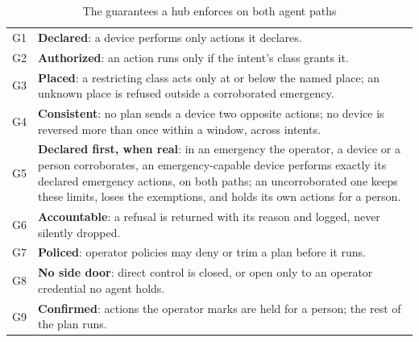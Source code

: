 \documentclass[conference]{IEEEtran}
\begin{document}
\begin{table}[t]
\caption{The guarantees a hub enforces on both agent paths}
\label{tab:guarantees}
\centering
\scriptsize
\setlength{\tabcolsep}{2.5pt}
\renewcommand{\arraystretch}{1.08}
\begin{tabular}{@{}l>{\raggedright\arraybackslash}p{}@{}}
\toprule
G1 & \textbf{Declared}: a device performs only actions it declares. \\
G2 & \textbf{Authorized}: an action runs only if the intent's class grants it. \\
G3 & \textbf{Placed}: a restricting class acts only at or below the named place; an unknown place is refused outside a corroborated emergency. \\
G4 & \textbf{Consistent}: no plan sends a device two opposite actions; no device is reversed more than once within a window, across intents. \\
G5 & \textbf{Declared first, when real}: in an emergency the operator, a device or a person corroborates, an emergency-capable device performs exactly its declared emergency actions, on both paths; an uncorroborated one keeps these limits, loses the exemptions, and holds its own actions for a person. \\
G6 & \textbf{Accountable}: a refusal is returned with its reason and logged, never silently dropped. \\
G7 & \textbf{Policed}: operator policies may deny or trim a plan before it runs. \\
G8 & \textbf{No side door}: direct control is closed, or open only to an operator credential no agent holds. \\
G9 & \textbf{Confirmed}: actions the operator marks are held for a person; the rest of the plan runs. \\
\bottomrule
\end{tabular}
\end{table}
\end{document}
